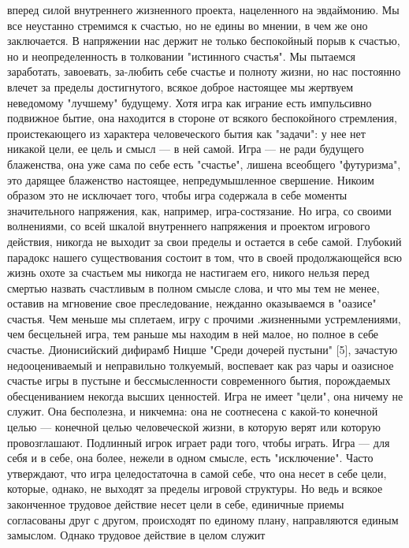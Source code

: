 \documentclass[12pt]{article}
\begin{document}
вперед силой внутреннего жизненного проекта, нацеленного на эвдаймонию. Мы все неустанно стремимся к
счастью, но не едины во мнении, в чем же оно заключается. В напряжении нас держит не только беспокойный
порыв к счастью, но и неопределенность в толковании "истинного счастья". Мы пытаемся заработать, завоевать,
за-любить себе счастье и полноту жизни, но нас постоянно влечет за пределы достигнутого, всякое доброе
настоящее мы жертвуем неведомому "лучшему" будущему. Хотя игра как играние есть импульсивно подвижное
бытие,  она  находится  в  стороне  от  всякого  беспокойного  стремления,  проистекающего  из  характера
человеческого бытия как "задачи": у нее нет никакой цели, ее цель и смысл --- в ней самой. Игра --- не ради
будущего  блаженства,  она  уже  сама  по  себе  есть  "счастье",  лишена  всеобщего  "футуризма",  это  дарящее
блаженство настоящее, непредумышленное свершение. Никоим образом это не исключает того, чтобы игра
содержала в себе моменты значительного напряжения, как, например, игра-состязание. Но игра, со своими
волнениями, со всей шкалой внутреннего напряжения и проектом игрового действия, никогда не выходит за
свои пределы и остается в себе самой. Глубокий парадокс нашего существования состоит в том, что в своей
продолжающейся всю жизнь охоте за счастьем мы никогда не настигаем его, никого нельзя перед смертью
назвать счастливым в полном смысле слова, и что мы тем не менее, оставив на мгновение свое преследование,
нежданно  оказываемся  в  "оазисе"  счастья.  Чем  меньше  мы  сплетаем,  игру  с  прочими  .жизненными
устремлениями,  чем  бесцельней  игра,  тем  раньше  мы  находим  в  ней  малое,  но  полное  в  себе  счастье.
Дионисийский  дифирамб  Ницше  "Среди  дочерей  пустыни"  [5],  зачастую  недооцениваемый  и  неправильно
толкуемый, воспевает как раз чары и оазисное счастье игры в пустыне и бессмысленности современного бытия,
порождаемых обесцениванием некогда высших ценностей. Игра не имеет "цели", она ничему не служит. Она
бесполезна, и никчемна: она не соотнесена с какой-то конечной целью --- конечной целью человеческой жизни, в
которую верят или которую провозглашают. Подлинный игрок играет ради того, чтобы играть. Игра --- для себя
и в себе, она более, нежели в одном смысле, есть "исключение". Часто утверждают, что игра целедостаточна в
самой себе, что она несет в себе цели, которые, однако, не выходят за пределы игровой структуры. Но ведь и
всякое  законченное  трудовое  действие  несет  цели  в  себе,  единичные  приемы  согласованы  друг  с  другом,
происходят по единому плану, направляются единым замыслом. Однако трудовое действие в целом служит
\end{document}
